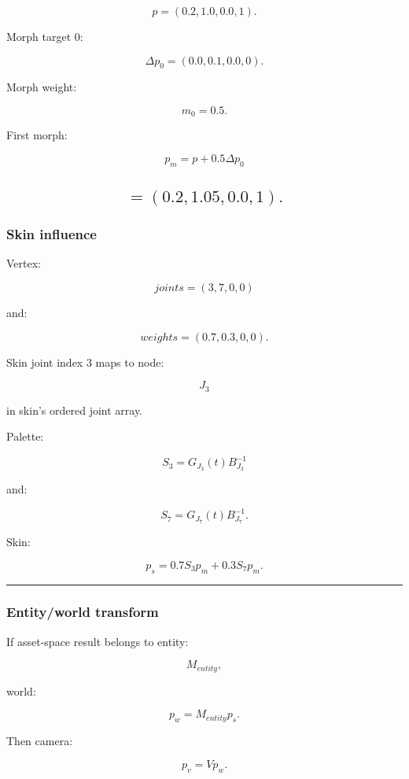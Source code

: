 \[
p=
(0.2,1.0,0.0,1).
\]

Morph target 0:

\[
\Delta p_0=
(0.0,0.1,0.0,0).
\]

Morph weight:

\[
m_0=0.5.
\]

First morph:

\[
p_m
=
p+
0.5\Delta p_0
\]

\subsection{\texorpdfstring{\[
=
(0.2,1.05,0.0,1).
\]}{
=
(0.2,1.05,0.0,1).
}}\label{section}

\subsubsection{Skin influence}\label{skin-influence}

Vertex:

\[
joints=
(3,7,0,0)
\]

and:

\[
weights=
(0.7,0.3,0,0).
\]

Skin joint index 3 maps to node:

\[
J_3
\]

in skin's ordered joint array.

Palette:

\[
S_3=
G_{J_3}(t)
B_{J_3}^{-1}
\]

and:

\[
S_7=
G_{J_7}(t)
B_{J_7}^{-1}.
\]

Skin:

\[
\boxed{
p_s
=
0.7S_3p_m
+
0.3S_7p_m.
}
\]

\begin{center}\rule{0.5\linewidth}{0.5pt}\end{center}

\subsubsection{Entity/world transform}\label{entityworld-transform}

If asset-space result belongs to entity:

\[
M_{entity},
\]

world:

\[
\boxed{
p_w=
M_{entity}p_s.
}
\]

Then camera:

\[
p_v=
Vp_w.
\]

